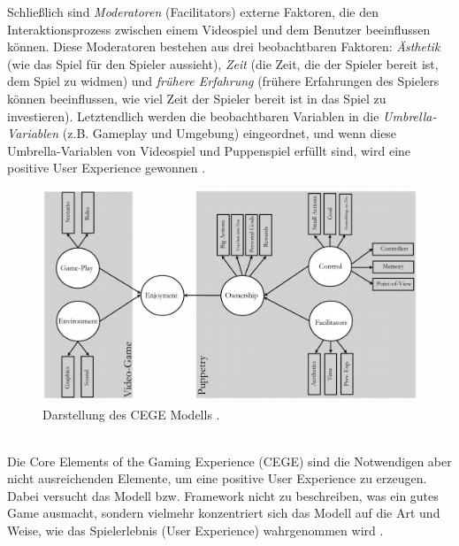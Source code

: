 \documentclass[a4paper,12pt,twoside]{scrartcl}
\begin{document}
Schließlich sind \textit{Moderatoren} (Facilitators) externe Faktoren, die den Interaktionsprozess zwischen einem Videospiel und dem Benutzer beeinflussen können. Diese Moderatoren bestehen aus drei beobachtbaren Faktoren: \textit{Ästhetik} (wie das Spiel für den Spieler aussieht), \textit{Zeit} (die Zeit, die der Spieler bereit ist, dem Spiel zu widmen) und \textit{frühere Erfahrung} (frühere Erfahrungen des Spielers können beeinflussen, wie viel Zeit der Spieler bereit ist in das Spiel zu investieren). Letztendlich werden die beobachtbaren Variablen in die \textit{Umbrella-Variablen} (z.B. Gameplay und Umgebung) eingeordnet, und wenn diese Umbrella-Variablen von Videospiel und Puppenspiel erfüllt sind, wird eine positive User Experience gewonnen \cite{CEGE2016}.
\\
\begin{figure}[h!]
\begin{center}
\includegraphics[scale = 0.6]{Bilder/CEGEModell.eps}
\caption{Darstellung des CEGE Modells \cite{Cege2009}.}
\label{CegeModelBild}
\end{center}
\end{figure}
\\
Die Core Elements of the Gaming Experience (CEGE) sind die Notwendigen aber nicht ausreichenden Elemente, um eine positive User Experience zu erzeugen. Dabei versucht das Modell bzw. Framework nicht zu beschreiben, was ein gutes Game ausmacht, sondern vielmehr konzentriert sich das Modell auf die Art und Weise, wie das Spielerlebnis (User Experience) wahrgenommen wird \cite{Cege2009}. 
\end{document}
